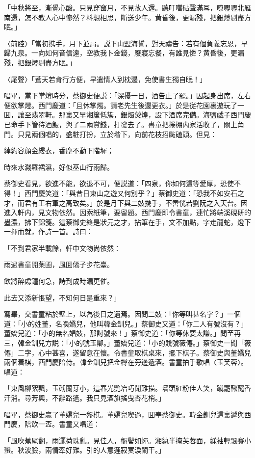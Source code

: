 「中秋將至，漸覺心酸。只見穿窗月，不見故人還。聽叮噹砧聲滿耳，嘹嚦嚦北雁南還，怎不教人心中慘然？料想相思，断送少年。黄昏後，更漏殘，把銀燈剔盡方眠。」

〈前腔〉「當初携手，月下並肩。説下山盟海誓，對天禱告：若有個負義忘恩，早歸九泉。一向如何音信遠，空教我卜金錢，廢寢忘餐，有誰見憐？黄昏後，更漏殘，把銀燈剔盡方眠。」

〈尾聲〉「蒼天若肯行方便，早遣情人到枕邊，免使書生獨自眠！」

唱畢，當下掌燈時分，蔡御史便説：「深擾一日，酒告止了罷。」因起身出席，左右便欲掌燈。西門慶道：「且休掌燭。請老先生後邊更衣。」於是従花園裏遊玩了一囬，讓至翡翠軒。那裏又早湘簾低簇，銀燭熒煌，設下酒席完備。海鹽戯子西門慶已命手下管待酒飯，與了二兩賞錢，打發去了。書童把捲棚内家活收了，關上角門。只見兩個唱的，盛粧打扮，立於堦下，向前花枝招颭磕頭。但見：

綽約容顔金縷衣，香塵不動下階墀；

時來水濺羅裙濕，好似巫山行雨歸。

蔡御史看見，欲進不能，欲退不可，便説道：「四泉，你如何這等愛厚，恐使不得！」西門慶笑道：「與昔日東山之遊又何別乎？」蔡御史道：「恐我不如安石之才，而君有王右軍之高致矣。」於是月下與二妓携手，不啻恍若劉阮之入天台。因進入軒内，見文物依然。因索紙筆，要留題。西門慶即令書童，連忙將端溪硯硏的墨濃，拂下錦箋。這蔡御史終是狀元之才，拈筆在手，文不加點，字走龍蛇，燈下一揮而就，作詩一首。詩曰：

「不到君家半載餘，軒中文物尚依然：

雨過書童開薬圃，風囬僊子步花臺。

飲將醉䖏鐘何急，詩到成時漏更催。

此去又添新悵望，不知何日是重來？」

寫畢，交書童粘於壁上，以為後日之遺焉。因問二妓：「你等叫甚名字？」一個道：「小的姓董，名喚嬌兒，他叫韓金釧兒。」蔡御史又道：「你二人有號沒有？」董嬌兒道：「小的無名娼妓，那討號來！」蔡御史道：「你等休要太謙。」問至再三，韓金釧兒方説：「小的號玉卿。」董嬌兒道：「小的賤號薇僊。」蔡御史一聞「薇僊」二字，心中甚喜，遂留意在懷。令書童取棋桌來，擺下棋子。蔡御史與董嬌兒兩個着棋，西門慶陪侍。韓金釧兒把金樽在旁邊遞酒。書童拍手歌唱〈玉芙蓉〉。唱道：

「東風柳絮飄，玉砌蘭芽小，這春光艷冶巧鬦難描。墻頭紅粉佳人笑，蹴罷鞦韆香汗消。尋芳興，不辭路遙。我只見酒旗搖曳杏花梢。」

唱畢，蔡御史贏了董嬌兒一盤棋。董嬌兒喫過，囬奉蔡御史。韓金釧兒這裏遞與西門慶，陪飲一盃。書童又唱道：

「風吹蕉尾翻，雨灑荷珠亂。見佳人，盤鬢如蟬。湘紈半掩芙蓉面，綵袖輕飄賽小蠻。秋波臉，兩情牽好難。引的人意遲寂寞淚闌干。」

